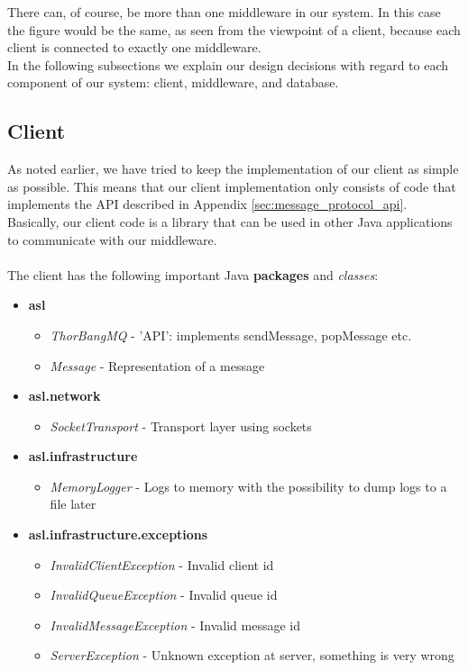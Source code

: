 \documentclass{article}
\begin{document}
         There can, of course, be more than one middleware in our system. In this case the figure would be the same, as seen from the viewpoint of a client, because each client is connected to exactly one middleware.\\
        In the following subsections we explain our design decisions with regard to each component of our system: client, middleware, and database.

        \subsection{Client}
            As noted earlier, we have tried to keep the implementation of our client as simple as possible. This means that our client implementation only consists of code that implements the API described in Appendix \ref{sec:message_protocol_api}. Basically, our client code is a library that can be used in other Java applications to communicate with our middleware.\\
            \\
            The client has the following important Java \textbf{packages} and \textit{classes}:
            \begin{itemize}
                \item \textbf{asl}
                    \begin{itemize}
                        \item \textit{ThorBangMQ} - 'API': implements sendMessage, popMessage etc.
                        \item \textit{Message} - Representation of a message
                    \end{itemize}
                \item \textbf{asl.network}
                \begin{itemize}
                     \item \textit{SocketTransport} - Transport layer using sockets
                 \end{itemize} 
                \item \textbf{asl.infrastructure}
                 \begin{itemize}
                    \item \textit{MemoryLogger} - Logs to memory with the possibility to dump logs to a file later
                \end{itemize}
                \item \textbf{asl.infrastructure.exceptions}
                \begin{itemize}
                    \item \textit{InvalidClientException} - Invalid client id
                    \item \textit{InvalidQueueException} - Invalid queue id
                    \item \textit{InvalidMessageException} - Invalid message id
                    \item \textit{ServerException} - Unknown exception at server, something is very wrong
                \end{itemize}
            \end{itemize}
\end{document}
